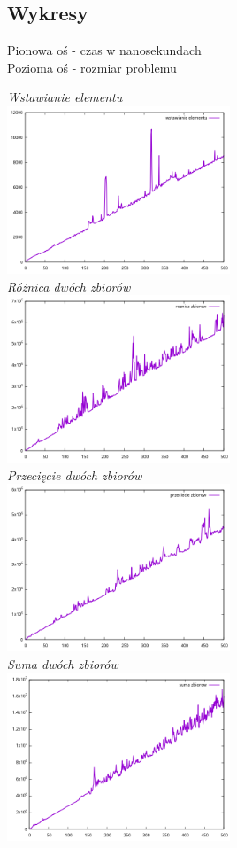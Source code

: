 \documentclass{article}
\begin{document}
\subsection*{Wykresy}
Pionowa oś - czas w nanosekundach\\
Pozioma oś - rozmiar problemu\\
\begin{center}
    \textit{Wstawianie elementu\\}
    \includegraphics[width=0.5\textwidth]{insert}\\
    \textit{Różnica dwóch zbiorów\\}
    \includegraphics[width=0.5\textwidth]{difference}\\
    \textit{Przecięcie dwóch zbiorów\\}
    \includegraphics[width=0.5\textwidth]{intersection}\\
    \textit{Suma dwóch zbiorów\\}
    \includegraphics[width=0.5\textwidth]{unify}\\
\end{center}
\end{document}
